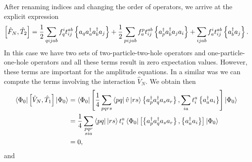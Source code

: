     After renaming indices and changing the order of operators, we arrive at the explicit expression
    \[
        \left[ \hat{F}_N, \hat{T}_2 \right]
        = \frac{1}{2} \sum_{qijab} f_q^i t_{ij}^{ab} \left\{a_q a^\dagger_a a^\dagger_b a_j\right\}
        + \frac{1}{2} \sum_{pijab} f_a^p t_{ij}^{ab} \left\{a^\dagger_p a^\dagger_b a_j a_i\right\}+ \sum_{ijab} f_a^i t_{ij}^{ab} \left\{a^\dagger_b a_j\right\}. 
    \]
In this case we have two sets of two-particle-two-hole operators and one-particle-one-hole operators and all these terms result in zero expectation values. 
However, these terms are important for the amplitude equations.  
In a similar was we can compute the terms involving the interaction $\hat{V}_N$.  
We obtain then
    \begin{align*}
        \bra{\Phi_0} \left[ \hat{V}_N, \hat{T}_1 \right] \ket{\Phi_0} &= 
            \bra{\Phi_0}
                \left[ \frac{1}{4} \sum_{pqrs} \bra{pq}\hat{v}\ket{rs} \left\{a^\dagger_p a^\dagger_q a_s  a_r\right\},
                    \sum_{ia} t_i^a \left\{a^\dagger_a a_i\right\} \right] \ket{\Phi_0} \\ 
            &= \frac{1}{4}\sum_{\substack{
                pqr \\
                sia}} \bra{pq}\ket{rs} t_i^a \bra{\Phi_0} 
                \left[ \left\{a^\dagger_p a^\dagger_q a_s  a_r\right\}, \left\{a^\dagger_a a_i\right\} \right]
                \ket{\Phi_0} \\ 
        &= 0,
    \end{align*}
and
